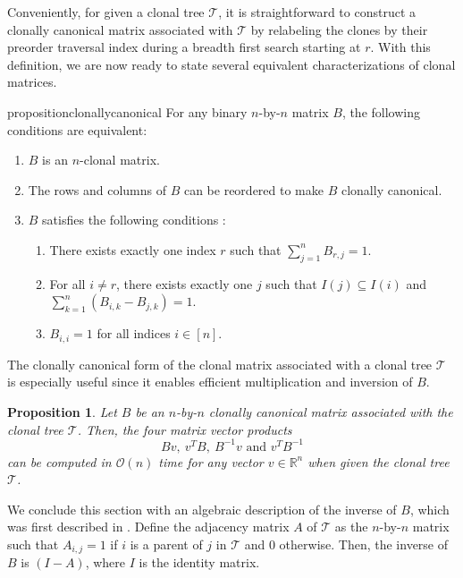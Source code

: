 \documentclass[10pt]{article}
\newtheorem{proposition}{Proposition}
\newcommand{\tree}{\mathcal{T}}
\begin{document}
Conveniently, for given a clonal tree $\tree$, it is straightforward to construct a clonally 
canonical matrix associated with $\tree$ by relabeling the clones by their preorder traversal 
index during a breadth first search starting at $r$. With this definition, we are now ready 
to state several equivalent characterizations of clonal matrices.

\begin{restatable}{proposition}{clonallycanonical}
    \label{prop:clonally_canonical}
    For any binary $n$-by-$n$ matrix $B$, the following conditions are
    equivalent:
    \begin{enumerate}[label=(\roman*)]
        \item $B$ is an $n$-clonal matrix.
        \item The rows and columns of $B$ can be reordered to make $B$ clonally canonical.
        \item $B$ satisfies the following conditions \cite{el-kebir_reconstruction_2015}:
            \begin{enumerate}
                \item There exists exactly one index $r$ such that $\sum_{j=1}^nB_{r, j} = 1$.
                \item For all $i \neq r$, there exists exactly one $j$ such that 
                    $I(j) \subseteq I(i)$ and $\sum_{k=1}^n\left(B_{i,k} - B_{j, k}\right)= 1$.
                \item $B_{i, i} = 1$ for all indices $i \in [n]$.
            \end{enumerate}
    \end{enumerate}
\end{restatable}
The clonally canonical form of the clonal matrix associated with a clonal tree $\tree$ is 
especially useful since it enables efficient multiplication and inversion of $B$. 

\begin{proposition}
    Let $B$ be an $n$-by-$n$ clonally canonical matrix associated with the clonal tree $\tree$. Then, the four matrix vector
    products \[Bv,\ v^TB,\ B^{-1}v \text{ and } v^TB^{-1}\] can be computed in $\mathcal{O}(n)$ 
    time for any vector $v \in \mathbb{R}^n$ when given the clonal tree $\tree$.
\end{proposition}

We conclude this section with an algebraic description of the
inverse of $B$, which was first described in \cite{jia_efficient_2018}.
Define the adjacency matrix $A$ of $\tree$ as the $n$-by-$n$ matrix 
such that $A_{i, j} = 1$ if $i$ is a parent of $j$ in $\tree$ and $0$ otherwise.
Then, the inverse of $B$ is $(I - A)$, where $I$ is the identity matrix.
\end{document}
